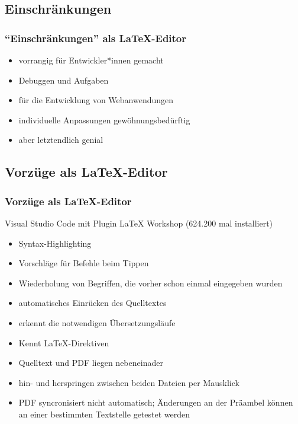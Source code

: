 \documentclass[t, %
							xcolor=dvipsnames,%
							hyperref={bookmarks,colorlinks},%
							]%
							{beamer}
\begin{document}
		\subsection{Einschränkungen}
		\label{sub:Einschraenkungen}
		\begin{frame}
			\frametitle{\enquote{Einschränkungen} als \LaTeX-Editor}
			\begin{itemize}
				\item vorrangig für Entwickler*innen gemacht
				\item Debuggen und Aufgaben
				\item für die  Entwicklung von Webanwendungen 
				\item individuelle Anpassungen gewöhnungsbedürftig
				\item aber letztendlich genial
			\end{itemize}
		\end{frame}

		\subsection{Vorzüge als \LaTeX-Editor}
		\label{sub:VorzuegeLaTeXEditor}
		\begin{frame}
			\frametitle{Vorzüge als \LaTeX-Editor}
			Visual Studio Code mit Plugin LaTeX Workshop (624.200 mal installiert)
			\begin{itemize}
				\item Syntax-Highlighting
				\item Vorschläge für Befehle beim Tippen
				\item Wiederholung von Begriffen, die vorher schon einmal eingegeben wurden
				\item automatisches Einrücken des Quelltextes
				\item erkennt die notwendigen Übersetzungsläufe
				\item Kennt LaTeX-Direktiven
				\item Quelltext und PDF liegen nebeneinader
				\item hin- und herspringen zwischen beiden Dateien per Mausklick
				\item PDF syncronisiert nicht automatisch; Änderungen an der Präambel können an einer bestimmten Textstelle getestet werden  
			\end{itemize}
		\end{frame}
\end{document}
